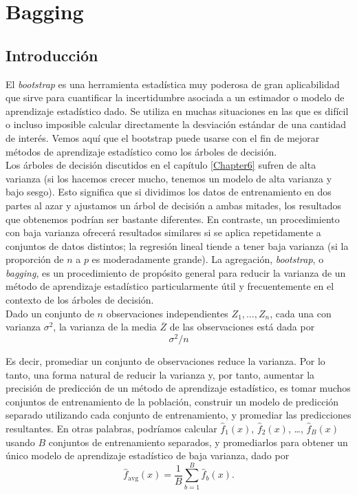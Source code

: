 \chapter{Bagging}\label{Chapter10} 

\section{Introducción}

El \textit{bootstrap} es una herramienta estadística muy poderosa de gran aplicabilidad que sirve para cuantificar la incertidumbre asociada a un estimador o modelo de aprendizaje estadístico dado. Se utiliza en muchas situaciones en las que es difícil o incluso imposible calcular directamente la desviación estándar de una cantidad de interés. Vemos aquí que el bootstrap puede usarse con el fin de mejorar métodos de aprendizaje estadístico como los árboles de decisión. \\

Los árboles de decisión discutidos en el capítulo \ref{Chapter6} sufren de alta varianza (si los hacemos crecer mucho, tenemos un modelo de alta varianza y bajo sesgo). Esto significa que si dividimos los datos de entrenamiento en dos partes al azar y ajustamos un árbol de decisión a ambas mitades, los resultados que obtenemos podrían ser bastante diferentes. En contraste, un procedimiento con baja varianza ofrecerá resultados similares si se aplica repetidamente a conjuntos de datos distintos; la regresión lineal tiende a tener baja varianza (si la proporción de $n$ a $p$ es moderadamente grande). La agregación, \textit{bootstrap}, o \textit{bagging}, es un procedimiento de propósito general para reducir la varianza de un método de aprendizaje estadístico particularmente útil y frecuentemente en el contexto de los árboles de decisión. \\

Dado un conjunto de $n$ observaciones independientes $Z_1, \ldots, Z_n$, cada una con varianza $\sigma^2$, la varianza de la media $\overline{Z}$ de las observaciones está dada por 
\begin{equation}
\sigma^2/n
\end{equation}

Es decir, promediar un conjunto de observaciones reduce la varianza. Por lo tanto, una forma natural de reducir la varianza y, por tanto, aumentar la precisión de predicción de un método de aprendizaje estadístico, es tomar muchos conjuntos de entrenamiento de la población, construir un modelo de predicción separado utilizando cada conjunto de entrenamiento, y promediar las predicciones resultantes. En otras palabras, podríamos calcular $\hat{f}_1(x)$, $\hat{f}_2(x)$, \ldots, $\hat{f}_B(x)$ usando $B$ conjuntos de entrenamiento separados, y promediarlos para obtener un único modelo de aprendizaje estadístico de baja varianza, dado por
\begin{equation}
\hat{f}_{\text{avg}}(x) = \frac{1}{B} \sum_{b=1}^{B} \hat{f}_b(x).
\end{equation}

